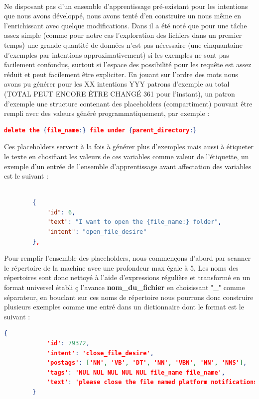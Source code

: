 		\paragraph{}
		Ne disposant pas d'un ensemble d'apprentissage pré-existant pour les intentions que nous avons développé, nous avons tenté d'en construire un nous même en l'enrichissant avec quelque modifications. Dans \cite{rasa_nlu} il a été noté que pour une tâche assez simple (comme pour notre cas l'exploration des fichiers dans un premier temps) une grande quantité de données n'est pas nécessaire (une cinquantaine d'exemples par intentions approximativement) si les exemples ne sont pas facilement confondus, surtout si l'espace des possibilité pour les requête est assez réduit et peut facilement être expliciter. En jouant sur l'ordre des mots nous avons pu générer pour les XX intentions YYY patrons d'exemple au total (TOTAL PEUT ENCORE ÊTRE CHANGÉ 361 pour l'instant), un patron d'exemple une structure contenant des placeholders (compartiment) pouvant être rempli avec des valeurs généré programmatiquement, par exemple : 
		\begin{lstlisting}[language=json]
		delete the {file_name:} file under {parent_directory:}\end{lstlisting}
		Ces placeholders servent à la fois à générer plus d'exemples mais aussi à étiqueter le texte en chosifiant les valeurs de ces variables comme valeur de l'étiquette, un exemple d'un entrée de l'ensemble d'apprentissage avant affectation des variables est le suivant : 
		\begin{lstlisting}[language=json]
		
		{
			"id": 6,
			"text": "I want to open the {file_name:} folder",
			"intent": "open_file_desire"
		},
		\end{lstlisting}
		Pour remplir l'ensemble des placeholders, nous commençons d'abord par scanner le répertoire de la machine avec une profondeur max égale à 5,
		Les noms des répertoires sont donc nettoyé à l'aide d'expressions régulière et transformé en un format universel établi ç l'avance \textbf{nom\_du\_fichier} en choisissant "\_" comme séparateur, en bouclant sur ces noms de répertoire nous pourrons donc construire plusieurs exemples comme une entré dans un dictionnaire dont le format est le suivant : 
		\begin{lstlisting}[language=json]
		{
			'id': 79372,
			'intent': 'close_file_desire',
			'postags': ['NN', 'VB', 'DT', 'NN', 'VBN', 'NN', 'NNS'],
			'tags': 'NUL NUL NUL NUL NUL file_name file_name',
			'text': 'please close the file named platform notifications'
		}
		\end{lstlisting}
